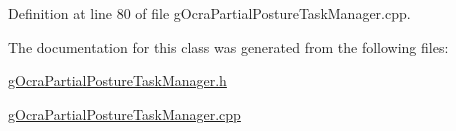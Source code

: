 Definition at line 80 of file g\+Ocra\+Partial\+Posture\+Task\+Manager.\+cpp.



The documentation for this class was generated from the following files\+:\begin{DoxyCompactItemize}
\item 
\hyperlink{gOcraPartialPostureTaskManager_8h}{g\+Ocra\+Partial\+Posture\+Task\+Manager.\+h}\item 
\hyperlink{gOcraPartialPostureTaskManager_8cpp}{g\+Ocra\+Partial\+Posture\+Task\+Manager.\+cpp}\end{DoxyCompactItemize}
